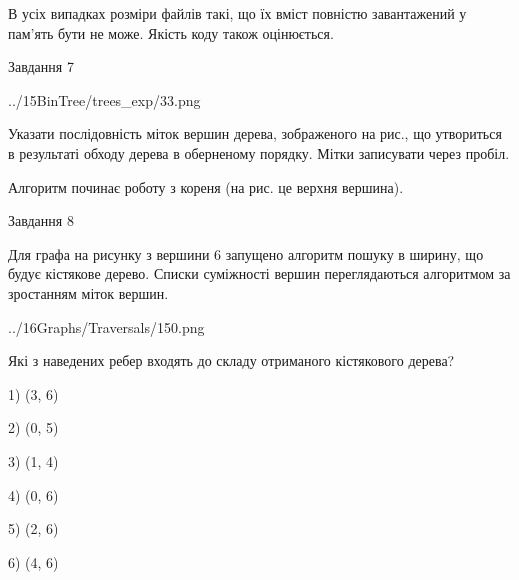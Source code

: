 \documentclass[12pt, ukrainian]{article}
\begin{document}
{В усіх випадках розміри файлів такі, що їх вміст повністю завантажений у пам'ять бути не може. Якість коду також оцінюється.



\vspace{10mm}\par

\newpage
\begin{minipage}[t]{9.7cm}
               
{\begin{center}Завдання {7}\end{center}}
\vspace{-4mm}

\begin{center}
	{../15BinTree/trees_exp/33.png}
\end{center}
Указати послідовність міток вершин дерева, зображеного на рис., що утвориться в результаті обходу дерева в оберненому порядку. Мітки записувати через пробіл.\par Алгоритм починає роботу з кореня (на рис. це верхня вершина).\par

\end{minipage}
\vline \hspace{8mm}
\begin{minipage}[t]{8.0cm}
               
{\begin{center}Завдання {8}\end{center}}
\vspace{-4mm}
Для графа на рисунку з вершини 6 запущено алгоритм пошуку в ширину, що будує кістякове дерево. Списки суміжності вершин переглядаються алгоритмом за зростанням міток вершин.\par
\begin{center}
	{../16Graphs/Traversals/150.png}
\end{center}
\par Які з наведених ребер входять до складу отриманого кістякового дерева?\par
1) (3, 6)\par
2) (0, 5)\par
3) (1, 4)\par
4) (0, 6)\par
5) (2, 6)\par
6) (4, 6)\par
{\vskip 15pt} \par


\end{minipage}}
\end{document}

